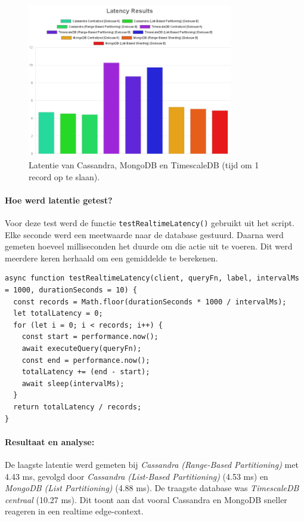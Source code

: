 \begin{figure}[H]
	\centering
	\includegraphics[width=0.8\textwidth]{charts/Latency.png}
	\caption{Latentie van Cassandra, MongoDB en TimescaleDB (tijd om 1 record op te slaan).}
	\label{fig:latency-comparison}
\end{figure}

\paragraph{Hoe werd latentie getest?}
Voor deze test werd de functie \texttt{testRealtimeLatency()} gebruikt uit het script. Elke seconde werd een meetwaarde naar de database gestuurd. Daarna werd gemeten hoeveel milliseconden het duurde om die actie uit te voeren. Dit werd meerdere keren herhaald om een gemiddelde te berekenen.

\begin{verbatim}
async function testRealtimeLatency(client, queryFn, label, intervalMs = 1000, durationSeconds = 10) {
  const records = Math.floor(durationSeconds * 1000 / intervalMs);
  let totalLatency = 0;
  for (let i = 0; i < records; i++) {
    const start = performance.now();
    await executeQuery(queryFn);
    const end = performance.now();
    totalLatency += (end - start);
    await sleep(intervalMs);
  }
  return totalLatency / records;
}
\end{verbatim}

\paragraph{Resultaat en analyse:}
De laagste latentie werd gemeten bij \textit{Cassandra (Range-Based Partitioning)} met 4.43 ms, gevolgd door \textit{Cassandra (List-Based Partitioning)} (4.53 ms) en \textit{MongoDB (List Partitioning)} (4.88 ms). De traagste database was \textit{TimescaleDB centraal} (10.27 ms). Dit toont aan dat vooral Cassandra en MongoDB sneller reageren in een realtime edge-context.


